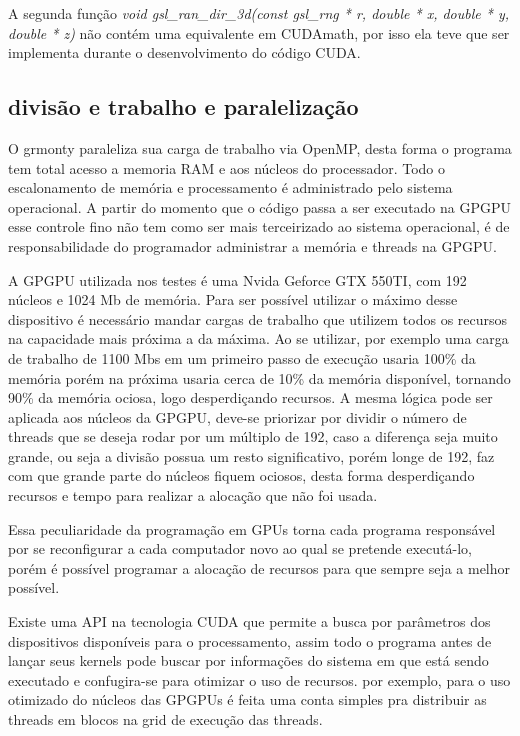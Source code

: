     A segunda função \textit{void gsl\_ran\_dir\_3d(const gsl\_rng * r, double * x, double * y, double * z)} não contém uma equivalente em CUDAmath, por isso ela teve que ser implementa durante o desenvolvimento do código CUDA.


  \subsection{divisão e trabalho e paralelização}
    O grmonty paraleliza sua carga de trabalho via OpenMP, desta forma o programa tem total acesso a memoria RAM e aos núcleos do processador. Todo o escalonamento de memória e processamento é administrado pelo sistema operacional. A partir do momento que o código passa a ser executado na GPGPU esse controle fino não tem como ser mais terceirizado ao sistema operacional, é de responsabilidade do programador administrar a memória e threads na GPGPU.

    A GPGPU utilizada nos testes é uma Nvida Geforce GTX 550TI, com 192 núcleos e 1024 Mb de memória. Para ser possível utilizar o máximo desse dispositivo é necessário mandar cargas de trabalho que utilizem todos os recursos na capacidade mais próxima a da máxima. Ao se utilizar, por exemplo uma carga de trabalho de 1100 Mbs em um primeiro passo de execução usaria 100\% da memória porém na próxima usaria cerca de 10\% da memória disponível, tornando 90\% da memória ociosa, logo desperdiçando recursos. A mesma lógica pode ser aplicada aos núcleos da GPGPU, deve-se priorizar por dividir o número de threads que se deseja rodar por um múltiplo de 192, caso a diferença seja muito grande, ou seja a divisão possua um resto significativo, porém longe de 192, faz com que grande parte do núcleos fiquem ociosos, desta forma desperdiçando recursos e tempo para realizar a alocação que não foi usada.

    Essa peculiaridade da programação em GPUs torna cada programa responsável por se reconfigurar a cada computador novo ao qual se pretende executá-lo, porém é possível programar a alocação de recursos para que sempre seja a melhor possível.

    Existe uma API na tecnologia CUDA que permite a busca por parâmetros dos dispositivos disponíveis para o processamento, assim todo o programa antes de lançar seus kernels pode buscar por informações do sistema em que está sendo executado e confugira-se para otimizar o uso de recursos. por exemplo, para o uso otimizado do núcleos das GPGPUs é feita uma conta simples pra distribuir as threads em blocos na grid de execução das threads.

